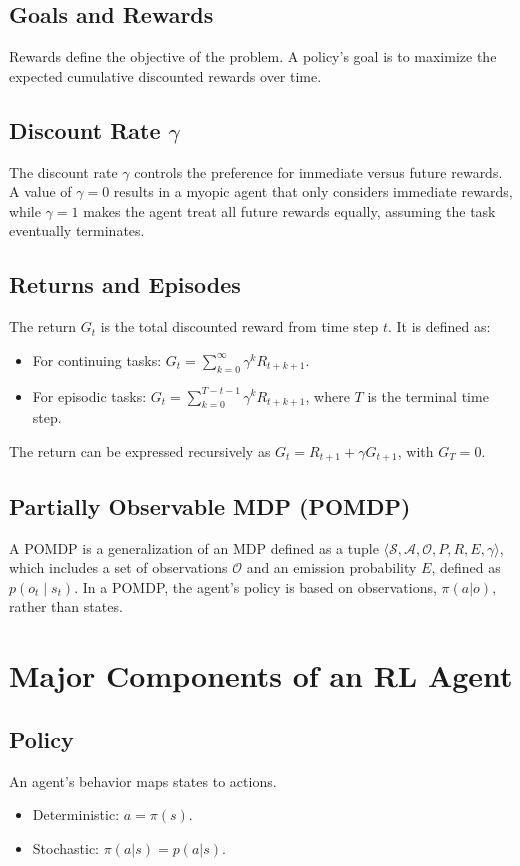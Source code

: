 \documentclass[12pt]{article}
\begin{document}
\subsection{Goals and Rewards}
Rewards define the objective of the problem. A policy's goal is to maximize the expected cumulative discounted rewards over time.

\subsection{Discount Rate $\gamma$}
The discount rate $\gamma$ controls the preference for immediate versus future rewards. A value of $\gamma=0$ results in a myopic agent that only considers immediate rewards, while $\gamma=1$ makes the agent treat all future rewards equally, assuming the task eventually terminates.

\subsection{Returns and Episodes}
The return $G_t$ is the total discounted reward from time step $t$. It is defined as:
\begin{itemize}
    \item For continuing tasks: $G_t = \sum_{k=0}^\infty \gamma^k R_{t+k+1}$.
    \item For episodic tasks: $G_t = \sum_{k=0}^{T-t-1} \gamma^k R_{t+k+1}$, where $T$ is the terminal time step.
\end{itemize}
The return can be expressed recursively as $G_t = R_{t+1} + \gamma G_{t+1}$, with $G_T = 0$.

\subsection{Partially Observable MDP (POMDP)}
A POMDP is a generalization of an MDP defined as a tuple $\langle \mathcal{S}, \mathcal{A}, \mathcal{O}, P, R, E, \gamma \rangle$, which includes a set of observations $\mathcal{O}$ and an emission probability $E$, defined as $p(o_t \mid s_t)$. In a POMDP, the agent's policy is based on observations, $\pi(a|o)$, rather than states.


\section{Major Components of an RL Agent }

\subsection{Policy}
An agent's behavior maps states to actions.
\begin{itemize}
    \item Deterministic: $a = \pi(s)$.
    \item Stochastic: $\pi(a|s) = p(a|s)$.
\end{itemize}
\end{document}
